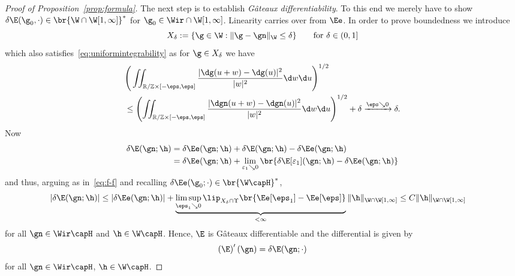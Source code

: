 \begin{proof}[Proof of Proposition~\ref{prop:formula}]
  The next step is to establish \emph{G\^ateaux differentiability}. To this end we merely have to show
 $\delta\E(\g_0,\cdot)\in\br{\W\cap\W[1,\infty]}^*$ for $\g_0\in\Wir\cap\W[1,\infty]$. Linearity carries over from $\Ee$.
 In order to prove boundedness we introduce
 \begin{equation}\label{eq:X_delta}
  X_\delta := \{ \g \in \W : \|\g - \gn\|_{\W} \leq \delta\}\qquad\text{for }\delta\in(0,1]
 \end{equation}
 which also satisfies~\eqref{eq:uniformintegrability} as
 for $\g \in X_\delta$ we have
 \begin{equation}\label{eq:Xdelta}
 \begin{split}
  &\Bigg( \iint_{\mathbb R / \mathbb Z \times [-\eps, \eps]}
  \frac {|\dg(u+w) - \dg(u)|^2}{|w|^2} \d w \d u \Bigg)^{1/2} \\
  &\leq \left( \iint_{\mathbb R / \mathbb Z \times [-\eps, \eps]}
  \frac {|\dgn(u+w) - \dgn(u)|^2}{|w|^2} \d w \d u \right)^{1/2}
 +  \delta \xrightarrow{\eps\searrow0} \delta.
 \end{split}  
 \end{equation}
 Now 
 \begin{align*}
  \delta \E(\gn;\h) 
  &= \delta \Ee(\gn;\h) + \delta \E(\gn;\h) - \delta \Ee(\gn;\h)
  \\
  &= \delta \Ee(\gn;\h) + \lim_{\varepsilon_1 \searrow0} 
   \br{\delta \E[\varepsilon_1] (\gn;\h) - \delta \Ee(\gn;\h)}
 \end{align*}
 and thus, arguing as in~\eqref{eq:f-f} and recalling $\delta\Ee(\g_0;\cdot)\in\br{\W\capH}^*$,
\begin{equation*}
\begin{aligned}
  | \delta \E(\gn;\h) |& \leq | \delta \Ee(\gn;\h) |
  +  \underbrace{\limsup_{\eps_1\searrow0}\lip_{X_\delta\cap\Upsilon}\br{\Ee[\eps_1]-\Ee[\eps]}}_{<\infty} \|\h\|_{\W\cap\W[1,\infty]}
  \leq C \|\h\|_{\W\cap\W[1,\infty]}
\end{aligned}
\end{equation*}
 for all $\gn \in \Wir \capH$ and $\h \in \W \capH$. Hence, $\E$ is G\^ateaux differentiable  and the 
differential is given by
\begin{equation*}
 \left(\E\right)'(\gn) = \delta \E(\gn;\cdot)
\end{equation*}
for all $\gn \in \Wir \capH$, $\h \in \W \capH$.


\end{proof}
